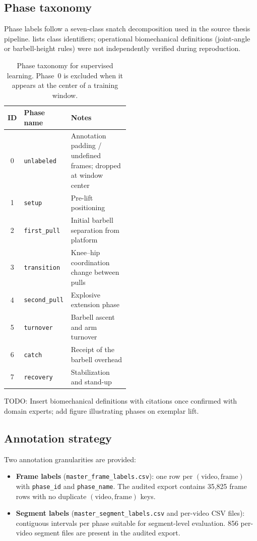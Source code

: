 \subsection{Phase taxonomy}
\label{sec:dataset:taxonomy}

Phase labels follow a seven-class snatch decomposition used in the source thesis pipeline.
 lists class identifiers; operational biomechanical definitions (joint-angle or barbell-height rules) were not independently verified during reproduction.

\begin{table}[t]
  \centering
  \caption{Phase taxonomy for supervised learning. Phase~0 is excluded when it appears at the center of a training window.}
  \label{tab:phase_taxonomy}
  \begin{tabular}{clp{0.48\linewidth}}
    \toprule
    ID & Phase name & Notes \\
    \midrule
    0 & \texttt{unlabeled} & Annotation padding / undefined frames; dropped at window center \\
    1 & \texttt{setup} & Pre-lift positioning \\
    2 & \texttt{first\_pull} & Initial barbell separation from platform \\
    3 & \texttt{transition} & Knee--hip coordination change between pulls \\
    4 & \texttt{second\_pull} & Explosive extension phase \\
    5 & \texttt{turnover} & Barbell ascent and arm turnover \\
    6 & \texttt{catch} & Receipt of the barbell overhead \\
    7 & \texttt{recovery} & Stabilization and stand-up \\
    \bottomrule
  \end{tabular}
\end{table}

\textsc{TODO:} Insert biomechanical definitions with citations once confirmed with domain experts; add figure illustrating phases on exemplar lift.

\subsection{Annotation strategy}
\label{sec:dataset:annotations}

Two annotation granularities are provided:
\begin{itemize}
  \item \textbf{Frame labels} (\texttt{master\_frame\_labels.csv}): one row per $(\text{video}, \text{frame})$ with \texttt{phase\_id} and \texttt{phase\_name}.
        The audited export contains 35{,}825 frame rows with no duplicate $(\text{video}, \text{frame})$ keys.
  \item \textbf{Segment labels} (\texttt{master\_segment\_labels.csv} and per-video CSV files): contiguous intervals per phase suitable for segment-level evaluation.
        856 per-video segment files are present in the audited export.
\end{itemize}

